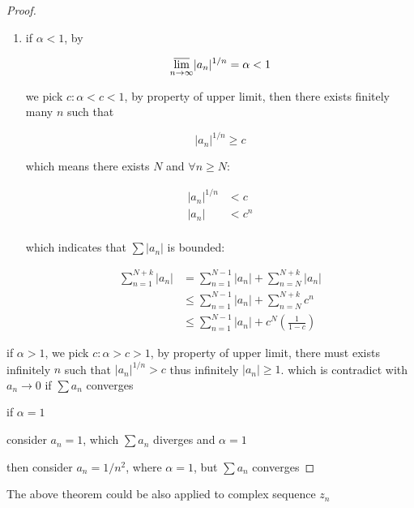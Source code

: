 \begin{proof}
   \begin{enumerate}
    \item if $\alpha < 1$, by

    \[
        \varlimsup_{n \to \infty}\lvert a_n\rvert^{1/n} = \alpha < 1
    \]

    we pick $c: \alpha < c < 1$, by property of upper limit, then there exists finitely many $n$ such that

    \[
        \lvert a_n\rvert^{1/n} \ge c
    \]

    which means there exists $N$ and $\forall n \ge N$:

    \begin{align*}
        \lvert a_n\rvert^{1/n} &< c \\
        \lvert a_n\rvert &< c^n \\
    \end{align*}

    which indicates that $\sum \lvert a_n \rvert$ is bounded:

    \begin{align*}
        \sum_{n=1}^{N+k}\lvert a_n \rvert &= \sum_{n=1}^{N-1}\lvert a_n \rvert + \sum_{n=N}^{N+k}\lvert a_n \rvert \\
        & \le \sum_{n=1}^{N-1}\lvert a_n \rvert + \sum_{n=N}^{N+k}c^n \\
        & \le \sum_{n=1}^{N-1}\lvert a_n \rvert + c^N(\frac{1}{1-c})
    \end{align*}
   \end{enumerate} 

   \item if $\alpha > 1$, we pick $c: \alpha > c  > 1$, by property of upper limit, there must exists 
   infinitely $n$ such that $\lvert a_n \rvert ^{1/n} > c$ thus infinitely $\lvert  a_n \rvert \ge 1$. 
   which is contradict with $a_n \to 0$ if $\sum a_n$ converges

   \item if $\alpha = 1$
   
   consider $a_n = 1$, which $\sum a_n $ diverges and $\alpha = 1$

   then consider $a_n = 1/n^2$, where $\alpha = 1$, but $\sum a_n$ converges
\end{proof}

\begin{corollary}
    \label{thm:thm-root-test-complex}
    The above theorem could be also applied to complex sequence $z_n$ 
\end{corollary}

